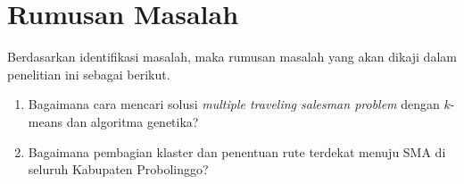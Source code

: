 \section{Rumusan Masalah}

Berdasarkan identifikasi masalah, maka rumusan masalah yang akan dikaji dalam penelitian ini sebagai berikut.
\begin{enumerate}
    \item Bagaimana cara mencari solusi \textit{multiple traveling salesman problem} dengan $k$-means dan algoritma genetika?
    \item Bagaimana pembagian klaster dan penentuan rute terdekat menuju SMA di seluruh Kabupaten Probolinggo?
\end{enumerate}